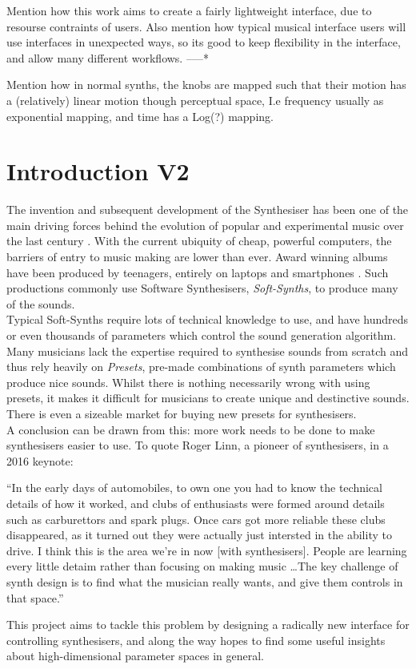 \documentclass[11pt, oneside]{report}   	%
\begin{document}
Mention how this work aims to create a fairly lightweight interface, due to resourse contraints of users. Also mention how typical musical interface users will use interfaces in unexpected ways, so its good to keep flexibility in the interface, and allow many different workflows.
-----*

Mention how in normal synths, the knobs are mapped such that their motion has a (relatively) linear motion though perceptual space, I.e frequency usually as exponential mapping, and time has a Log(?) mapping.

\chapter{Introduction V2}
The invention and subsequent development of the Synthesiser has been one of the main driving forces behind the evolution of popular and experimental music over the last century \cite{DOTHIS}. With the current ubiquity of cheap, powerful computers, the barriers of entry to music making are lower than ever. Award winning albums have been produced by teenagers, entirely on laptops and smartphones \cite{DOTHIS}. Such productions commonly use Software Synthesisers, \emph{Soft-Synths}, to produce many of the sounds.\\
Typical Soft-Synths require lots of technical knowledge to use, and have hundreds or even thousands of parameters which control the sound generation algorithm. Many musicians lack the expertise required to synthesise sounds from scratch and thus rely heavily on \emph{Presets}, pre-made combinations of synth parameters which produce nice sounds. Whilst there is nothing necessarily wrong with using presets, it makes it difficult for musicians to create unique and destinctive sounds. There is even a sizeable market for buying new presets for synthesisers.\\
A conclusion can be drawn from this: more work needs to be done to make synthesisers easier to use. To quote Roger Linn, a pioneer of synthesisers, in a 2016 keynote: \cite{RogerLinn}
\begin{displayquote}
	``In the early days of automobiles, to own one you had to know the technical details of how it worked, and clubs of enthusiasts were formed around details such as carburettors and spark plugs. Once cars got more reliable these clubs disappeared, as it turned out they were actually just intersted in the ability to drive. I think this is the area we're in now [with synthesisers]. People are learning every little detaim rather than focusing on making music \dots The key challenge of synth design is to find what the musician really wants, and give them controls in that space.''
\end{displayquote}
This project aims to tackle this problem by designing a radically new interface for controlling synthesisers, and along the way hopes to find some useful insights about high-dimensional parameter spaces in general.
%
\end{document}
